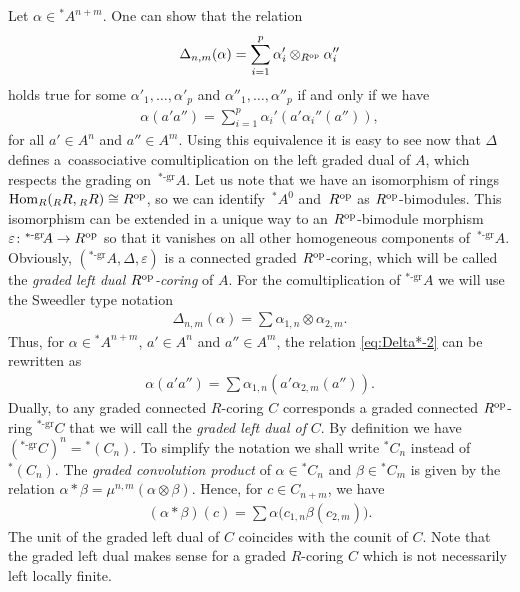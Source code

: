 \documentclass[pdftex]{sigma}
\newcommand\ot{\otimes}
\renewcommand{\^}[1]{\mbox{$^{\left( #1 \right)}$}}
\renewcommand{\_}[1]{\mbox{$_{\left( #1 \right)}$}}
\newcommand{\al}{\alpha}
\numberwithin{equation}{section}
\begin{document}
Let $ \alpha \in {^*}\!A^{n+m}$. One can show that the relation
\begin{gather*}
\Delta_{n,m}(\alpha) = \sum_{i=1}^p \alpha'_{i} \ot_{R^{\rm op}} \alpha_{i}''%
\end{gather*}
holds true for some $\al'_1,\dots,\al'_p$ and $\al''_1,\dots,\al''_p$ if and only if we have
\begin{gather}
 \alpha(a'a'') =\sum_{i=1}^p \alpha_{i}'(a'\alpha_{i}''(a'')),\label{eq:Delta*-2}
\end{gather}
for all $a' \in A^n$ and $a'' \in A^m$. Using this equivalence it is easy to see now that $\Delta$ def\/ines a~coassociative comultiplication on the left graded dual of $A$, which respects the grading on~$^{*\text{-gr}}\!A$. Let us note that we have an isomorphism of rings $\operatorname{Hom}_R({_R}R,{_R}R)\cong R^{\rm op}$, so we can identify~${^*}\!A^0$ and~$R^{\rm op}$ as $R^{\rm op}$-bimodules. This isomorphism can be extended in a unique way to an $R^{\rm op}$-bimodule morphism $\varepsilon\colon {^{*\text{-gr}}\!A}\to R^{\rm op}$ so that it vanishes on all other homogeneous components of~$^{*\text{-gr}}\! A$. Obviously, $({}^{*\text{-gr}}\! A,\Delta, \varepsilon)$ is a connected graded $R^{\rm op}$-coring, which will be called the \textit{graded left dual $R^{\rm op}$-coring} of $A$. For the comultiplication of $^{*\text{-gr}}\! A$ we will use the Sweedler type notation
\begin{gather}\label{eq:sweedler}
 \Delta_{n,m}(\alpha)=\sum \alpha_{1,n}\ot\alpha_{2,m}.
\end{gather}
Thus, for $\al\in {}^\ast\!A^{n+m}$, $a' \in A^n$ and $a'' \in A^m$, the relation \eqref{eq:Delta*-2} can be rewritten as
\begin{gather}\label{eq:Delta*-3}
 \alpha(a'a'') = \sum \alpha_{1,n}(a'\alpha_{2,m}(a'')).
\end{gather}
Dually, to any graded connected $R$-coring $C$ corresponds a graded connected $R^{\rm op}$-ring $^{*\text{-gr}}C$ that we will call the \emph{graded left dual of} $C$. By def\/inition we have $(^{*\text{-gr}}C)^n={}^*(C_n)$. To simplify the notation we shall write $^*C_n$ instead of $^*(C_n)$. The \emph{graded convolution product} of $\alpha\in {^*C}_n$ and $\beta\in {^*C}_m$ is given by the relation $\alpha*\beta=\mu^{n,m}(\alpha \ot \beta)$. Hence, for $c\in C_{n+m}$, we have
\begin{gather*}
(\alpha*\beta)(c)=\sum\alpha\big(c_{1,n}\beta(c_{2,m})\big).
\end{gather*}
The unit of the graded left dual of $C$ coincides with the counit of $C$. Note that the graded left dual makes sense for a graded $R$-coring $C$ which is not necessarily left locally f\/inite.
\end{document}
